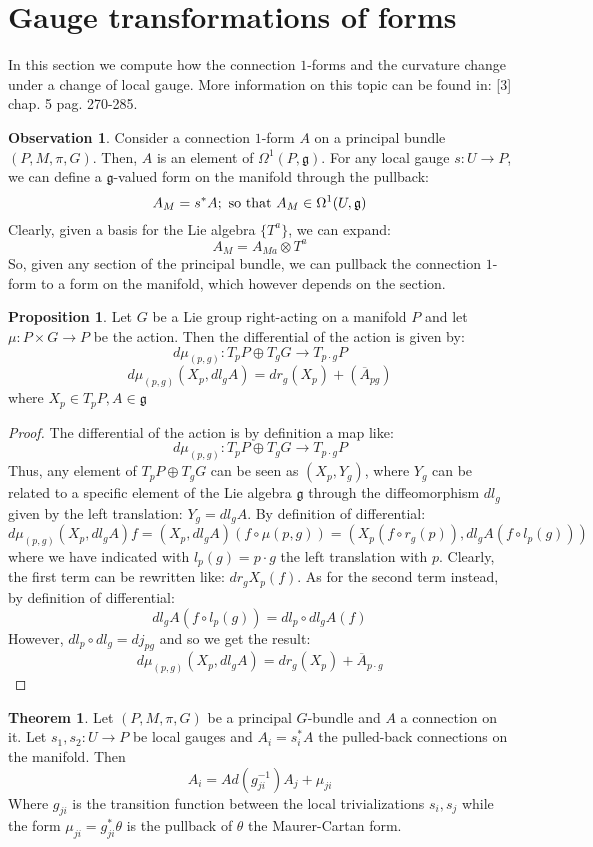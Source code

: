 \documentclass[12pt,a4paper]{report}
\theoremstyle{definition}
\theoremstyle{Theorem}
\newtheorem{Theo}[Def]{Theorem}
\newtheorem{Prop}[Def]{Proposition}
\theoremstyle{definition}
\theoremstyle{definition}
\newtheorem{Obs}[Def]{Observation}
\begin{document}
	\section{Gauge transformations of forms}
	In this section we compute how the connection $1$-forms and the curvature change under a change of local gauge. More information on this topic can be found in: [3] chap. 5 pag. 270-285.
	\begin{Obs}
		Consider a connection $1$-form $A$ on a principal bundle $(P,M,\pi,G)$. Then, $A$ is an element of $\Omega^1(P,\mathfrak{g})$. For any local gauge $s:U\rightarrow P$, we can define a $\mathfrak{g}$-valued form on the manifold through the pullback:
		$$A_M=s^*A;\hbox{ so that }A_M\in \Omega^1(U,\mathfrak{g})$$
		Clearly, given a basis for the Lie algebra $\{T^a\}$, we can expand:
		$$A_M=A_{Ma}\otimes T^a$$
		So, given any section of the principal bundle, we can pullback the connection $1$-form to a form on the manifold, which however depends on the section.
	\end{Obs}
	\begin{Prop}\label{Prop_7.2.1}
		Let $G$ be a Lie group right-acting on a manifold $P$ and let $\mu:P\times G\rightarrow P$ be the action. Then the differential of the action is given by:
		$$d\mu_{(p,g)}:T_pP\oplus T_gG\rightarrow T_{p\cdot g}P$$
		$$d\mu_{(p,g)}(X_p,dl_gA)=dr_g(X_p)+(\overline{A}_{pg})$$
		where $X_p\in T_pP,A\in\mathfrak{g}$
	\end{Prop}
	\begin{proof}
		The differential of the action is by definition a map like:
		$$d\mu_{(p,g)}:T_pP\oplus T_gG\rightarrow T_{p\cdot g}P$$
		Thus, any element of $T_pP\oplus T_gG$ can be seen as $(X_p,Y_g)$, where $Y_g$ can be related to a specific element of the Lie algebra $\mathfrak{g}$ through the diffeomorphism $dl_g$ given by the left translation: $Y_g=dl_gA$.
		By definition of differential:
		$$d\mu_{(p,g)}(X_p,dl_gA)f=(X_p,dl_gA)(f\circ \mu(p,g))=(X_p(f\circ r_g(p)),dl_gA(f\circ l_p(g)))$$
		where we have indicated with $l_p(g)=p\cdot g$ the left translation with $p$. Clearly, the first term can be rewritten like: $dr_gX_p(f)$. As for the second term instead, by definition of differential:
		$$dl_gA(f\circ l_p(g))=dl_p\circ dl_gA(f)$$
		However, $dl_p\circ dl_g=dj_{pg}$ and so we get the result:
		$$d\mu_{(p,g)}(X_p,dl_gA)=dr_g(X_p)+\overline{A}_{p\cdot g}$$
	\end{proof}
	\begin{Theo} \label{Theo_7.2.1}
		Let $(P,M,\pi,G)$ be a principal $G$-bundle and $A$ a connection on it. Let $s_1,s_2:U\rightarrow P$ be local gauges and $A_{i}=s_i^*A$ the pulled-back connections on the manifold. Then 
		$$A_i=Ad(g_{ji}^{-1})A_j+\mu_{ji}$$
		Where $g_{ji}$ is the transition function between the local trivializations $s_i,s_j$ while the form $\mu_{ji}=g_{ji}^*\theta$ is the pullback of $\theta$ the Maurer-Cartan form.
	\end{Theo}
\end{document}
